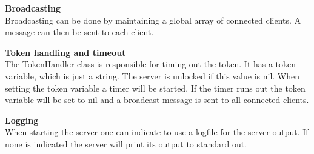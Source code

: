 \textbf{Broadcasting} \\
Broadcasting can be done by maintaining a global array of connected clients. A message can then be sent to each client.

\textbf{Token handling and timeout} \\
The TokenHandler class is responsible for timing out the token. It has a token variable, which is just a string. The server is unlocked if this value is nil. When setting the token variable a timer will be started. If the timer runs out the token variable will be set to nil and a broadcast message is sent to all connected clients.

\textbf{Logging} \\
When starting the server one can indicate to use a logfile for the server output. If none is indicated the server will print its output to standard out.
